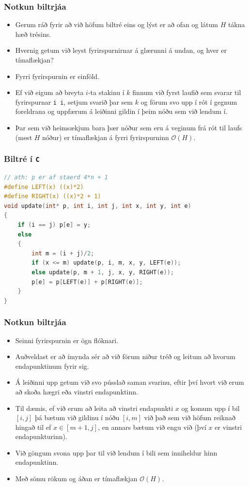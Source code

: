 \documentclass{beamer}
\begin{document}
\begin{frame}
\frametitle{Notkun biltrjáa}
\begin{itemize}
\item<1-> Gerum ráð fyrir að við höfum biltré eins og lýst er að ofan og látum $H$ tákna hæð trésins.
\item<2-> Hvernig getum við leyst fyrirspurnirnar á glærunni á undan, og hver er tímaflækjan?
\item<3-> Fyrri fyrirspurnin er einföld.
\item<4-> Ef við eigum að breyta $i$-ta stakinu í $k$ finnum við fyrst laufið sem svarar til fyrirspurnar \texttt{i i},
	setjum svarið þar sem $k$ og förum svo upp í rót í gegnum foreldrana og uppfærum á leiðinni gildin í þeim nóðu sem við lendum í.
\item<5-> Þar sem við heimsækjum bara þær nóður sem eru á veginum frá rót til laufs (mest $H$ nóður) er tímaflækjan á fyrri fyrirspurninn $\mathcal{O}(H)$.
\end{itemize}
\end{frame}

\begin{frame}[fragile]
	\frametitle{Biltré í \texttt{C}}
	\tiny
	\begin{lstlisting}[language=C]
// ath: p er af staerd 4*n + 1
#define LEFT(x) ((x)*2)
#define RIGHT(x) ((x)*2 + 1)
void update(int* p, int i, int j, int x, int y, int e)
{
	if (i == j) p[e] = y;
	else
	{
		int m = (i + j)/2;
		if (x <= m) update(p, i, m, x, y, LEFT(e));
		else update(p, m + 1, j, x, y, RIGHT(e));
		p[e] = p[LEFT(e)] + p[RIGHT(e)];
	}
}
\end{lstlisting}
\end{frame}

\begin{frame}
\frametitle{Notkun biltrjáa}
\begin{itemize}
\item<1-> Seinni fyrirspurnin er ögn flóknari.
\item<2-> Auðveldast er að ímynda sér að við förum niður tréð og leitum að hvorum endapunktinum fyrir sig.
\item<3-> Á leiðinni upp getum við svo pússlað saman svarinu, eftir því hvort við erum að skoða hægri eða vinstri endapunktinn.
\item<4-> Til dæmis, ef við erum að leita að vinstri endapunkti $x$ og komum upp í bil $[i, j]$ þá bætum við gildinu í nóðu
$[i, m]$ við það sem við höfum reiknað hingað til ef $x \in [m + 1, j]$, en annars bætum við engu við (því $x$ er vinstri endapunkturinn).
\item<5-> Við göngum svona upp þar til við lendum í bili sem inniheldur hinn endapunktinn.
\item<6-> Með sömu rökum og áðan er tímaflækjan $\mathcal{O}(H)$.
\end{itemize}
\end{frame}
\end{document}
